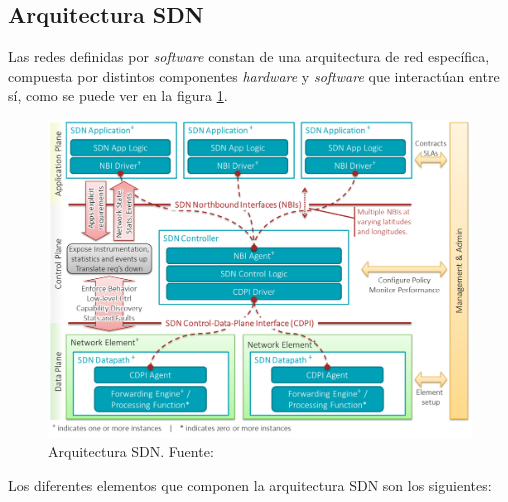 \subsection{Arquitectura SDN}

Las redes definidas por \textit{software} constan de una arquitectura de red específica, compuesta por distintos componentes \textit{hardware} y \textit{software} que interactúan entre sí, como se puede ver en la figura \ref{fig:arquitecturasdn}.
 
\begin{figure}[!ht]
	\centering
	\includegraphics[width=0.75\linewidth]{imagenes/arquitectura_sdn}
	\caption{Arquitectura SDN. Fuente:\cite{sdnbib}}
	\label{fig:arquitecturasdn}
\end{figure}

Los diferentes elementos que componen la arquitectura SDN son los siguientes:

